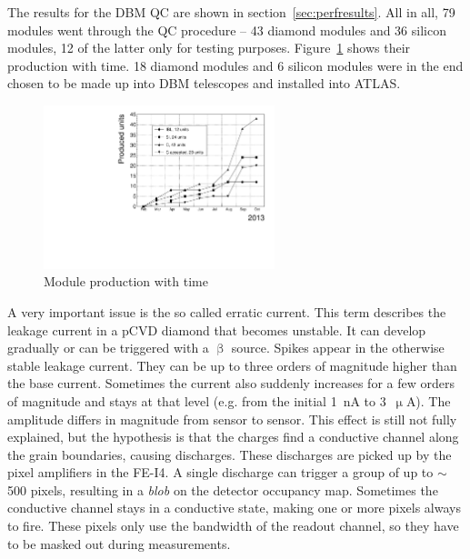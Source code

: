 \documentclass[twoside,12pt]{packages/mytustyle}  %
\begin{document}
The results for the DBM QC are shown in section~\ref{sec:perfresults}.  All in all, 79 modules went through the QC procedure -- 43 diamond modules and 36 silicon modules, 12 of the latter only for testing purposes. Figure~\ref{fig:production} shows their production with time. 18 diamond modules and 6 silicon modules were in the end chosen to be made up into DBM telescopes and installed into ATLAS.
\begin{figure}[!t]
\centering
\includegraphics[width=0.6\textwidth]{../../scripts/04_charge_monitoring/plots/production}
\caption{Module production with time}
\label{fig:production}
\end{figure}

A very important issue is the so called erratic current. This term describes the leakage current in a pCVD diamond that becomes unstable. It can develop gradually or can be triggered with a $\upbeta$ source. Spikes appear in the otherwise stable leakage current. They can be up to three orders of magnitude higher than the base current. Sometimes the current also suddenly increases for a few orders of magnitude and stays at that level (e.g. from the initial 1~nA to 3~$\upmu$A). The amplitude differs in magnitude from sensor to sensor. This effect is still not fully explained, but the hypothesis is that the charges find a conductive channel along the grain boundaries, causing discharges. These discharges are picked up by the pixel amplifiers in the FE-I4. A single discharge can trigger a group of up to $\sim$500 pixels, resulting in a \emph{blob} on the detector occupancy map. Sometimes the conductive channel stays in a conductive state, making one or more pixels always to fire. These pixels only use the bandwidth of the readout channel, so they have to be masked out during measurements. 
\end{document}
